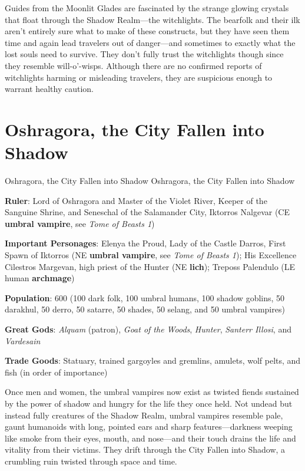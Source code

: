\documentclass[10pt,a4paper,twoside,bg=print,twocolumn,openany,nodeprecatedcode]{dndbook}
\begin{document}
Guides from the Moonlit Glades are fascinated by the strange glowing crystals that float through the Shadow Realm—the witchlights. The bearfolk and their ilk aren't entirely sure what to make of these constructs, but they have seen them time and again lead travelers out of danger—and sometimes to exactly what the lost souls need to survive. They don't fully trust the witchlights though since they resemble will-o'-wisps. Although there are no confirmed reports of witchlights harming or misleading travelers, they are suspicious enough to warrant healthy caution.

\section{Oshragora, the City Fallen into Shadow}
\begin{DndSidebar}[float=!b]{Oshragora, the City Fallen into Shadow}
Oshragora, the City Fallen into Shadow



\textbf{Ruler}: Lord of Oshragora and Master of the Violet River, Keeper of the Sanguine Shrine, and Seneschal of the Salamander City, Iktorros Nalgevar (CE \textbf{umbral vampire}, see \textit{Tome of Beasts 1})



\textbf{Important Personages}: Elenya the Proud, Lady of the Castle Darros, First Spawn of Iktorros (NE \textbf{umbral vampire}, see \textit{Tome of Beasts 1}); His Excellence Cilestros Margevan, high priest of the Hunter (NE \textbf{lich}); Treposs Palendulo (LE human \textbf{archmage})



\textbf{Population}: 600 (100 dark folk, 100 umbral humans, 100 shadow goblins, 50 darakhul, 50 derro, 50 satarre, 50 shades, 50 selang, and 50 umbral vampires)



\textbf{Great Gods}: \textit{Alquam} (patron), \textit{Goat of the Woods}, \textit{Hunter}, \textit{Santerr Illosi}, and \textit{Vardesain}



\textbf{Trade Goods}: Statuary, trained gargoyles and gremlins, amulets, wolf pelts, and fish (in order of importance)





\end{DndSidebar}

Once men and women, the umbral vampires now exist as twisted fiends sustained by the power of shadow and hungry for the life they once held. Not undead but instead fully creatures of the Shadow Realm, umbral vampires resemble pale, gaunt humanoids with long, pointed ears and sharp features—darkness weeping like smoke from their eyes, mouth, and nose—and their touch drains the life and vitality from their victims. They drift through the City Fallen into Shadow, a crumbling ruin twisted through space and time.
\end{document}
